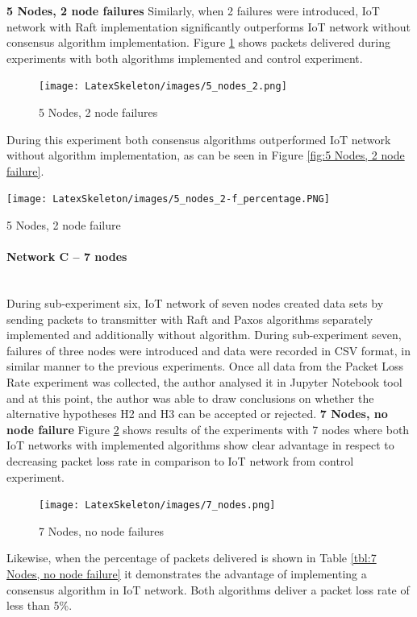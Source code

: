 \documentclass[oneside,12pt]{book}
\newcommand{\myparagraph}[1]{\paragraph{#1}\mbox{}\\}
\begin{document}
\noindent\textbf{5 Nodes, 2 node failures}\smallskip \newline
Similarly, when 2 failures were introduced, IoT network with Raft implementation significantly outperforms IoT network without consensus algorithm implementation. Figure \ref{fig:5 Nodes, 2 node failures} shows packets delivered during experiments with both algorithms implemented and control experiment.
\begin{figure}[H]
    \centering
    \texttt{[image: LatexSkeleton/images/5\_nodes\_2.png]}
    \caption{5 Nodes, 2 node failures}\label{fig:5 Nodes, 2 node failures}
\end{figure}
\noindent During this experiment both consensus algorithms outperformed IoT network without algorithm implementation, as can be seen in Figure \ref{fig:5 Nodes, 2 node failure}.
\begin{table}[H]
  \centering
  \label{tbl:5 Nodes, 2 node failure}
  \texttt{[image: LatexSkeleton/images/5\_nodes\_2-f\_percentage.PNG]}
  \caption{5 Nodes, 2 node failure}\label{fig:5 Nodes, 2 node failure}
\end{table}
\myparagraph{Network C – 7 nodes}
During sub-experiment six, IoT network of seven nodes created data sets by sending packets to transmitter with Raft and Paxos algorithms separately implemented and additionally without algorithm. During sub-experiment seven, failures of three nodes were introduced and data were recorded in CSV format, in similar manner to the previous experiments.\smallskip \newline
Once all data from the Packet Loss Rate experiment was collected, the author analysed it in Jupyter Notebook tool and at this point, the author was able to draw conclusions on whether the alternative hypotheses H2 and H3 can be accepted or rejected.
\noindent\textbf{7 Nodes, no node failure }\smallskip \newline
Figure \ref{fig:7 Nodes, no node failures} shows results of the experiments with 7 nodes where both IoT networks with implemented algorithms show clear advantage in respect to decreasing packet loss rate in comparison to IoT network from control experiment.  
\begin{figure}[H]
    \centering
    \texttt{[image: LatexSkeleton/images/7\_nodes.png]}
    \caption{7 Nodes, no node failures}\label{fig:7 Nodes, no node failures}
\end{figure}
\noindent Likewise, when the percentage of packets delivered is shown in Table \ref{tbl:7 Nodes, no node failure} it demonstrates the advantage of implementing a consensus algorithm in IoT network. Both algorithms deliver a packet loss rate of less than 5\%.
\end{document}
